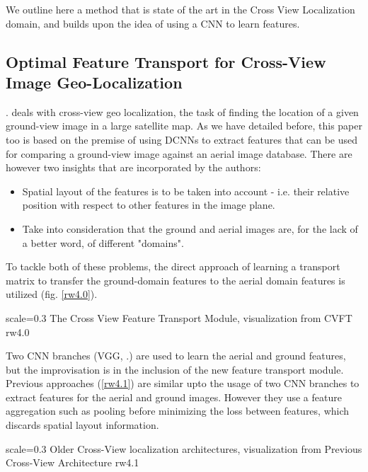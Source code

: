 We outline here a method that is state of the art in the Cross View Localization domain, and builds upon the idea of using a CNN to learn features. 

\subsection{Optimal Feature Transport for Cross-View Image Geo-Localization}
\cite{Shi2019}. deals with cross-view geo localization, the task of finding the location of a given ground-view image in a large satellite map. As we have detailed before, this paper too is based on the premise of using DCNNs to extract features that can be used for comparing a ground-view image against an aerial image database. There are however two insights that are incorporated by the authors:

\begin{itemize}
	\item Spatial layout of the features is to be taken into account - i.e. their relative position with respect to other features in the image plane. 
	
	\item Take into consideration that the ground and aerial images are, for the lack of a better word, of different "domains". 
\end{itemize}

To tackle both of these problems, the direct approach of learning a transport matrix to transfer the ground-domain features to the aerial domain features is utilized (fig. \ref{rw4.0}). 

{scale=0.3}%
{The Cross View Feature Transport Module, visualization from \cite{Shi2019}}%
{CVFT}%
{rw4.0} %

Two CNN branches (VGG, \cite{Simonyan2015}.) are used to learn the aerial and ground features, but the improvisation is in the inclusion of the new feature transport module. Previous approaches (\ref{rw4.1}) are similar upto the usage of two CNN branches to extract features for the aerial and ground images. However they use a feature aggregation such as pooling before minimizing the loss between features, which discards spatial layout information.

{scale=0.3}%
{Older Cross-View localization architectures, visualization from \cite{Shi2019}}%
{Previous Cross-View Architecture}%
{rw4.1} %

